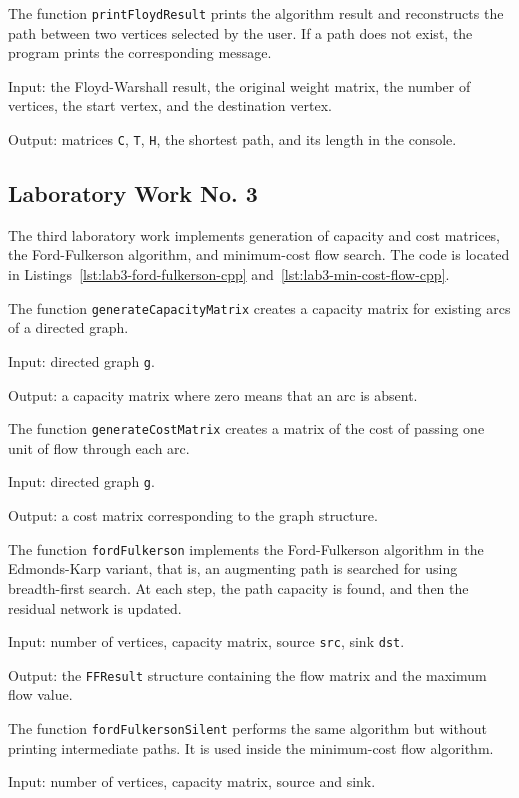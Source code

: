 \documentclass[a4paper,final]{article}
\begin{document}
The function \texttt{printFloydResult} prints the algorithm result and reconstructs the path between two vertices selected by the user. If a path does not exist, the program prints the corresponding message.

Input: the Floyd-Warshall result, the original weight matrix, the number of vertices, the start vertex, and the destination vertex.

Output: matrices \texttt{C}, \texttt{T}, \texttt{H}, the shortest path, and its length in the console.

\subsection{Laboratory Work No. 3}

The third laboratory work implements generation of capacity and cost matrices, the Ford-Fulkerson algorithm, and minimum-cost flow search. The code is located in Listings~\ref{lst:lab3-ford-fulkerson-cpp} and~\ref{lst:lab3-min-cost-flow-cpp}.

The function \texttt{generateCapacityMatrix} creates a capacity matrix for existing arcs of a directed graph.

Input: directed graph \texttt{g}.

Output: a capacity matrix where zero means that an arc is absent.

The function \texttt{generateCostMatrix} creates a matrix of the cost of passing one unit of flow through each arc.

Input: directed graph \texttt{g}.

Output: a cost matrix corresponding to the graph structure.

The function \texttt{fordFulkerson} implements the Ford-Fulkerson algorithm in the Edmonds-Karp variant, that is, an augmenting path is searched for using breadth-first search. At each step, the path capacity is found, and then the residual network is updated.

Input: number of vertices, capacity matrix, source \texttt{src}, sink \texttt{dst}.

Output: the \texttt{FFResult} structure containing the flow matrix and the maximum flow value.

The function \texttt{fordFulkersonSilent} performs the same algorithm but without printing intermediate paths. It is used inside the minimum-cost flow algorithm.

Input: number of vertices, capacity matrix, source and sink.
\end{document}
